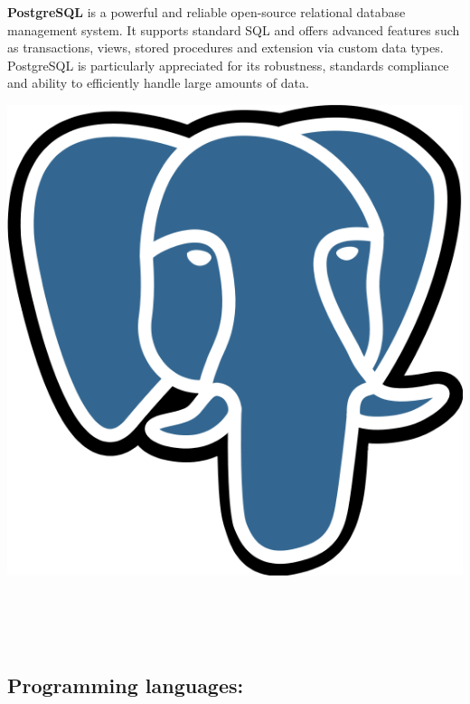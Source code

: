 \noindent%
\begin{minipage}{.7\textwidth}%
    \textbf{PostgreSQL} is a powerful and reliable open-source relational database management system. It supports standard SQL and offers advanced features such as transactions, views, stored procedures and extension via custom data types. PostgreSQL is particularly appreciated for its robustness, standards compliance and ability to efficiently handle large amounts of data.
\end{minipage}%
\hfill
\begin{minipage}{.18\textwidth}%
\includegraphics[width=\textwidth]{images/postgresql.png}
\end{minipage} \\ \\ \\

\subsection{Programming languages:}

\vspace{0.5cm}

